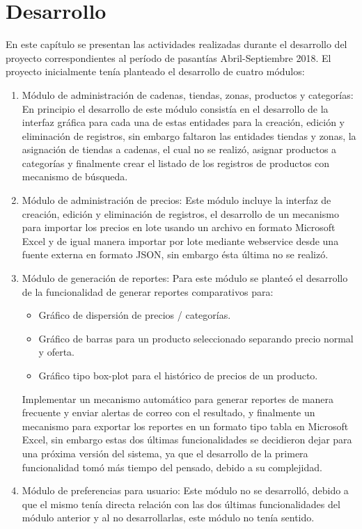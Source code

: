 \chapter{Desarrollo} \label{development}
En este capítulo se presentan las actividades realizadas durante el desarrollo del proyecto correspondientes al período de pasantías Abril-Septiembre 2018. El proyecto inicialmente tenía planteado el desarrollo de cuatro módulos:
\begin{enumerate}
	\item Módulo de administración de cadenas, tiendas, zonas, productos y categorías: En principio el desarrollo de este módulo consistía en el desarrollo de la interfaz gráfica para cada una de estas entidades para la creación, edición y eliminación de registros, sin embargo faltaron las entidades tiendas y zonas, la asignación de tiendas a cadenas, el cual no se realizó, asignar productos a categorías y finalmente crear el listado de los registros de productos con mecanismo de búsqueda.
	\item Módulo de administración de precios: Este módulo incluye la interfaz de creación, edición y eliminación de registros, el desarrollo de un mecanismo para importar los precios en lote usando un archivo en formato Microsoft Excel y de igual manera importar por lote mediante webservice desde una fuente externa en formato JSON, sin embargo ésta última no se realizó.
	\item Módulo de generación de reportes: Para este módulo se planteó el desarrollo de la funcionalidad de generar reportes comparativos para: 
    \begin{itemize}
        \item Gráfico de dispersión de precios / categorías.
        \item Gráfico de barras para un producto seleccionado separando precio normal y oferta.
        \item Gráfico tipo box-plot para el histórico de precios de un producto.
	\end{itemize}
	Implementar un mecanismo automático para generar reportes de manera frecuente y enviar alertas de correo con el resultado, y finalmente un mecanismo para exportar los reportes en un formato tipo tabla en Microsoft Excel, sin embargo estas dos últimas funcionalidades se decidieron dejar para una próxima versión del sistema, ya que el desarrollo de la primera funcionalidad tomó más tiempo del pensado, debido a su complejidad.
	\item Módulo de preferencias para usuario: Este módulo no se desarrolló, debido a que el mismo tenía directa relación con las dos últimas funcionalidades del módulo anterior y al no desarrollarlas, este módulo no tenía sentido. 
\end{enumerate}
